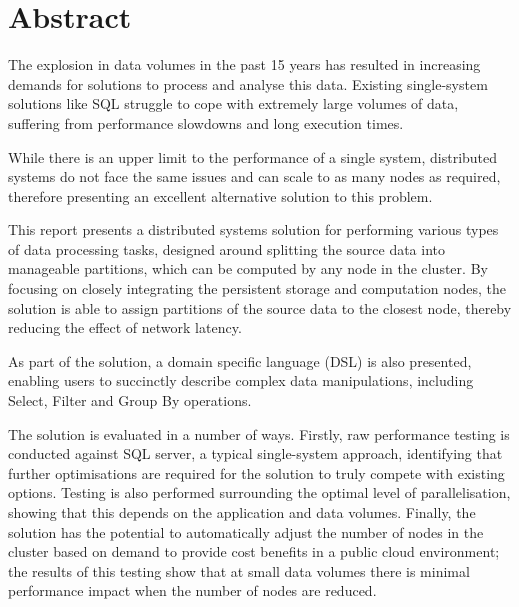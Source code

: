 \chapter*{Abstract}

The explosion in data volumes in the past 15 years has resulted in increasing demands for solutions to process and analyse this data. Existing single-system solutions like SQL struggle to cope with extremely large volumes of data, suffering from performance slowdowns and long execution times. 

While there is an upper limit to the performance of a single system, distributed systems do not face the same issues and can scale to as many nodes as required, therefore presenting an excellent alternative solution to this problem.

This report presents a distributed systems solution for performing various types of data processing tasks, designed around splitting the source data into manageable partitions, which can be computed by any node in the cluster. By focusing on closely integrating the persistent storage and computation nodes, the solution is able to assign partitions of the source data to the closest node, thereby reducing the effect of network latency. 

As part of the solution, a domain specific language (DSL) is also presented, enabling users to succinctly describe complex data manipulations, including Select, Filter and Group By operations.

The solution is evaluated in a number of ways. Firstly, raw performance testing is conducted against SQL server, a typical single-system approach, identifying that further optimisations are required for the solution to truly compete with existing options. Testing is also performed surrounding the optimal level of parallelisation, showing that this depends on the application and data volumes. Finally, the solution has the potential to automatically adjust the number of nodes in the cluster based on demand to provide cost benefits in a public cloud environment; the results of this testing show that at small data volumes there is minimal performance impact when the number of nodes are reduced.

